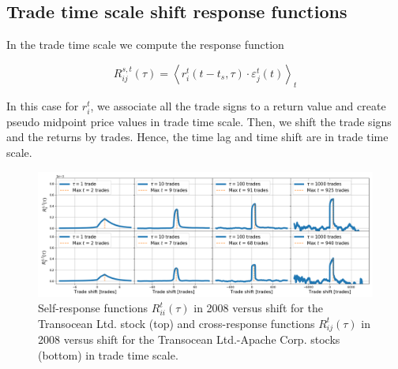 \subsection{Trade time scale shift response functions}
\label{subsec:time_shift_trade}

In the trade time scale we compute the response function

\begin{equation}\label{eq:time_shift_trade}
    R_{ij}^{s, t}\left(\tau\right)=\left\langle r^{t}_{i}
    \left(t-t_{s},\tau\right) \cdot\varepsilon^{t}_{j}
    \left(t\right)\right\rangle _{t}
\end{equation}

In this case for $r^{t}_{i}$, we associate all the trade signs to a return
value and create pseudo midpoint price values in trade time scale. Then, we
shift the trade signs and the returns by trades. Hence, the time lag and time
shift are in trade time scale.

\begin{figure}[htbp]
    \centering
    \includegraphics[width=\textwidth]{figures/04_shift_trade_RIG_APA.png}
    \caption{Self-response functions $R_{ii}^{t}\left(\tau\right)$ in 2008
             versus shift for the Transocean Ltd. stock (top) and
             cross-response functions $R_{ij}^{t}\left(\tau\right)$ in 2008
             versus shift for the Transocean Ltd.-Apache Corp. stocks (bottom)
             in trade time scale.}
    \label{fig:shift_trade_scale}
\end{figure}

